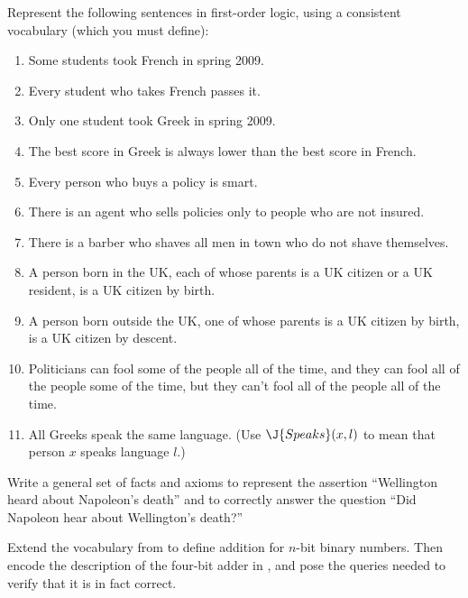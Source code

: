 \begin{iexercise}
Represent the following sentences in first-order logic, using a consistent
vocabulary (which you must define):
\begin{enumerate}
\item Some students took French in spring 2009.
\item Every student who takes French passes it.
\item Only one student took Greek in spring 2009.
\item The best score in Greek is always lower than the best score in French.
\item Every person who buys a policy is smart.
\item There is an agent who sells policies only to people who are not insured.
\item There is a barber who shaves all men in town who do not shave themselves.
\item A person born in the UK, each of whose parents is a UK citizen or a UK resident, is a UK citizen by birth.
\item A person born outside the UK, one of whose parents is a UK citizen by birth, is a UK citizen
by descent.
\item Politicians can fool some of the people all of the time, and they can fool
all of the people some of the time, but they can't fool all of the people all
of the time.
\item All Greeks speak the same language. (Use \(\J{Speaks}(x,l)\) to mean that person \(x\)
speaks language \(l\).)
\end{enumerate}
\end{iexercise} 

\begin{exercise}
Write a general set of facts and axioms to represent the assertion
``Wellington heard about Napoleon's death'' and to correctly answer the question
``Did Napoleon hear about Wellington's death?''
\end{exercise} 

\begin{exercise}%
\prgex Extend the vocabulary from  to define
addition for \(n\)-bit binary numbers.
Then encode the description of the four-bit adder in ,
and pose the queries needed to verify that it is in fact correct.
\end{exercise} 

